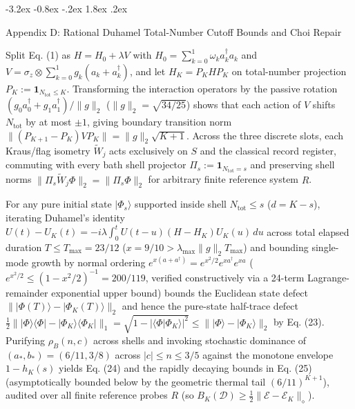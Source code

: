 \documentclass[11pt,letterpaper]{article}
\makeatletter
\renewcommand\section{\@startsection{section}{1}{\z@}%
  {-3.2ex \@plus -0.8ex \@minus -.2ex}%
  {1.8ex \@plus .2ex}%
  {\normalfont\Large\bfseries\raggedright\hyphenpenalty=10000}}
\theoremstyle{definition}
\makeatother
\begin{document}
\section{Appendix D: Rational Duhamel Total-Number Cutoff Bounds and
Choi
Repair}\label{appendix-d-rational-duhamel-total-number-cutoff-bounds-and-choi-repair}

Split Eq. (1) as \(H = H_0 + \lambda V\) with
\(H_0 = \sum_{k=0}^1 \omega_k a_k^\dagger a_k\) and
\(V = \sigma_z \otimes \sum_{k=0}^1 g_k(a_k + a_k^\dagger)\), and let
\(H_K = P_K H P_K\) on total-number projection
\(P_K := \mathbf{1}_{N_{\mathrm{tot}} \le K}\). Transforming the
interaction operators by the passive rotation
\((g_0 a_0^\dagger + g_1 a_1^\dagger)/\|g\|_2\)
(\(\|g\|_2 = \sqrt{34/25}\)) shows that each action of \(V\) shifts
\(N_{\mathrm{tot}}\) by at most \(\pm 1\), giving boundary transition
norm \(\|(P_{K+1} - P_K) V P_K\| = \|g\|_2\sqrt{K+1}\). Across the three
discrete slots, each Kraus/flag isometry \(\widetilde{W}_j\) acts
exclusively on \(S\) and the classical record register, commuting with
every bath shell projector
\(\Pi_s := \mathbf{1}_{N_{\mathrm{tot}} = s}\) and preserving shell
norms \(\|\Pi_s \widetilde{W}_j \Phi\|_2 = \|\Pi_s \Phi\|_2\) for
arbitrary finite reference system \(R\).

For any pure initial state \(|\Phi_s\rangle\) supported inside shell
\(N_{\mathrm{tot}} \le s\) (\(d = K - s\)), iterating Duhamel's identity
\(U(t) - U_K(t) = -i\lambda \int_0^t U(t - u)(H - H_K)U_K(u)\,du\)
across total elapsed duration \(T \le T_{\max} = 23/12\)
(\(x = 9/10 > \lambda_{\max}\|g\|_2 T_{\max}\)) and bounding single-mode
growth by normal ordering
\(e^{x(a+a^\dagger)} = e^{x^2/2}e^{x a^\dagger}e^{x a}\)
(\(e^{x^2/2} \le (1 - x^2/2)^{-1} = 200/119\), verified constructively
via a 24-term Lagrange-remainder exponential upper bound) bounds the
Euclidean state defect \(\||\Phi(T)\rangle - |\Phi_K(T)\rangle\|_2\) and
hence the pure-state half-trace defect
\(\frac{1}{2}\||\Phi\rangle\langle\Phi| - |\Phi_K\rangle\langle\Phi_K|\|_1 = \sqrt{1 - |\langle\Phi|\Phi_K\rangle|^2} \le \||\Phi\rangle - |\Phi_K\rangle\|_2\)
by Eq. (23). Purifying \(\rho_B(n, c)\) across shells and invoking
stochastic dominance of \((a_*, b_*) = (6/11, 3/8)\) across
\(|c| \le n \le 3/5\) against the monotone envelope \(1 - h_K(s)\)
yields Eq. (24) and the rapidly decaying bounds in Eq. (25)
(asymptotically bounded below by the geometric thermal tail
\((6/11)^{K+1}\)), audited over all finite reference probes \(R\) (so
\(B_K(\mathcal{D}) \ge \frac{1}{2}\|\mathcal{E} - \mathcal{E}_K\|_\diamond\)).
\end{document}

